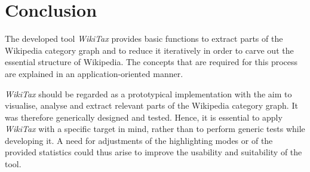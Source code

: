 \documentclass{scrartcl}
\begin{document}
\section{Conclusion}
\label{sec:conclusion}

The developed tool \emph{WikiTax} provides basic functions to extract parts of the Wikipedia category graph and to reduce it iteratively in order to carve out the essential structure of Wikipedia. The concepts that are required for this process are explained in an application-oriented manner.

\emph{WikiTax} should be regarded as a prototypical implementation with the aim to visualise, analyse and extract relevant parts of the Wikipedia category graph. It was therefore generically designed and tested. Hence, it is essential to apply \emph{WikiTax} with a specific target in mind, rather than to perform generic tests while developing it. A need for adjustments of the highlighting modes or of the provided statistics could thus arise to improve the usability and suitability of the tool.



\end{document}

